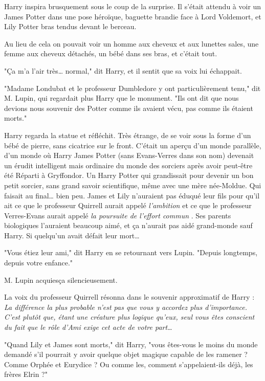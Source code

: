 Harry inspira brusquement sous le coup de la surprise. Il s'était attendu à voir un James Potter dans une pose héroïque, baguette brandie face à Lord Voldemort, et Lily Potter bras tendus devant le berceau.

Au lieu de cela on pouvait voir un homme aux cheveux et aux lunettes sales, une femme aux cheveux détachés, un bébé dans ses bras, et c'était tout.

"Ça m'a l'air très… normal," dit Harry, et il sentit que sa voix lui échappait.

"Madame Londubat et le professeur Dumbledore y ont particulièrement tenu," dit M. Lupin, qui regardait plus Harry que le monument. "Ils ont dit que nous devions nous souvenir des Potter comme ils avaient vécu, pas comme ils étaient morts."

Harry regarda la statue et réfléchit. Très étrange, de se voir sous la forme d'un bébé de pierre, sans cicatrice sur le front. C'était un aperçu d'un monde parallèle, d'un monde où Harry James Potter (sans Evans-Verres dans son nom) devenait un érudit intelligent mais ordinaire du monde des sorciers après avoir peut-être été Réparti à Gryffondor. Un Harry Potter qui grandissait pour devenir un bon petit sorcier, sans grand savoir scientifique, même avec une mère née-Moldue. Qui faisait au final… bien peu. James et Lily n'auraient pas éduqué leur fils pour qu'il ait ce que le professeur Quirrell aurait appelé \emph{l'ambition}  et ce que le professeur Verres-Evans aurait appelé \emph{la poursuite de l'effort commun} . Ses parents biologiques l'auraient beaucoup aimé, et ça n'aurait pas aidé grand-monde sauf Harry. Si quelqu'un avait défait leur mort…

"Vous étiez leur ami," dit Harry en se retournant vers Lupin. "Depuis longtemps, depuis votre enfance."

M. Lupin acquiesça silencieusement.

La voix du professeur Quirrell résonna dans le souvenir approximatif de Harry : \emph{La différence la plus probable n'est pas que vous y accordez plus d'importance. C'est plutôt que, étant une créature plus logique qu'eux, seul vous êtes conscient du fait que le rôle d'Ami exige cet acte de votre part…} 

"Quand Lily et James sont morts," dit Harry, "vous êtes-vous le moins du monde demandé s'il pourrait y avoir quelque objet magique capable de les ramener ? Comme Orphée et Eurydice ? Ou comme les, comment s'appelaient-ils déjà, les frères Elrin ?"

